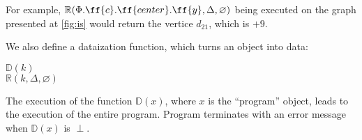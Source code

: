 For example, \(\mathbb{R}(\Phi.\ff{c}.\ff{center}.\ff{y},\Delta, \varnothing)\)
being executed on the graph presented at
\cref{fig:is} would return the vertice \(d_{21}\), which is \(+9\).

We also define a dataization function, which turns an object into data:

\begin{algo}
 \(\mathbb{D}(k)\) \\
  \tab {} \(\mathbb{R}(k, \Delta, \varnothing)\) \\
\end{algo}

The execution of the function \(\mathbb{D}(x)\), where \(x\) is the
``program'' object, leads to the execution of the entire program.
Program terminates with an error message when \(\mathbb{D}(x)\) is \(\perp\).

